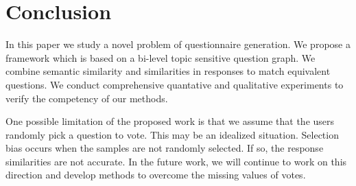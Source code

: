 \documentclass{llncs}
\begin{document}
\section{Conclusion}\label{sec:conclusion}
In this paper we study a novel problem of questionnaire generation. We propose a framework which is based on a bi-level topic sensitive question graph. We combine semantic similarity and similarities in responses to match equivalent questions. We conduct comprehensive quantative and qualitative experiments to verify the competency of our methods. 

One possible limitation of the proposed work is that we assume that the users randomly pick a question to vote. This may be an idealized situation. Selection bias occurs when the samples are not randomly selected. If so, the response similarities are not accurate. In the future work, we will continue to work on this direction and develop methods to overcome the missing values of votes.
\end{document}
